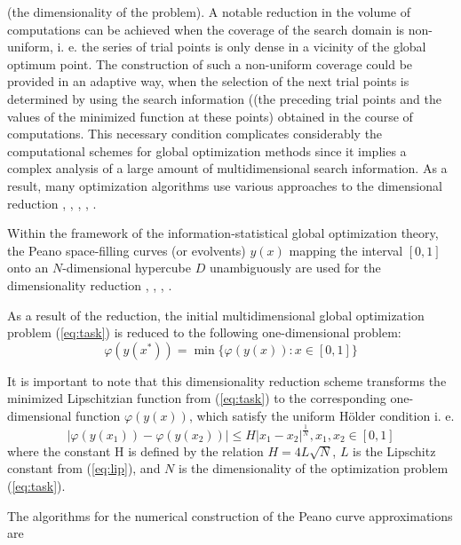 \documentclass{aims}
\theoremstyle{definition}
\begin{document}
(the dimensionality of the problem). A notable reduction in the volume of computations
can be achieved when the coverage of the search domain is non-uniform, i. e. the series
of trial points is only dense in a vicinity of the global optimum point. The construction
of such a non-uniform coverage could be provided in an adaptive way, when the selection
of the next trial points is determined by using the search information ((the preceding
trial points and the values of the minimized function at these points) obtained in the course
of computations. This necessary condition complicates considerably the computational schemes
for global optimization methods since it implies a complex analysis of a large amount
of multidimensional search information. As a result, many optimization algorithms use
various approaches to the dimensional reduction \cite{pinterGO}, \cite{sergeyevStronginLera2013}, \cite{strongin1978}, \cite{stronginGergelBarkalovParGO}, \cite{strSergGO}.
\par
Within the framework of the information-statistical global optimization theory,
the Peano space-filling curves (or evolvents) \(y(x)\) mapping the interval \([0,1]\)
onto an \(N\)-dimensional hypercube \(D\) unambiguously are used for the dimensionality
reduction \cite{sergeyevStronginLera2013}, \cite{strongin1978}, \cite{stronginGergelBarkalovParGO}, \cite{strSergGO}.
\par
As a result of the reduction, the initial multidimensional global optimization
problem (\ref{eq:task}) is reduced to the following one-dimensional problem:
\begin{equation}
\label{eq:oneDimTask}
\varphi(y(x^*))=\min\{\varphi(y(x)):x\in [0,1]\}
\end{equation}
\par
It is important to note that this dimensionality reduction scheme transforms the minimized
Lipschitzian function from (\ref{eq:task}) to the corresponding one-dimensional
function \(\varphi(y(x))\), which satisfy the uniform H{\"o}lder condition i. e.
\begin{equation}
\label{eq:holder}
|\varphi(y(x_1))-\varphi(y(x_2))|\leq H{|x_1-x_2|}^{\frac{1}{N}},x_1,x_2\in[0,1]
\end{equation}
where the constant H is defined by the relation \(H=4L\sqrt{N}\), \(L\) is the Lipschitz
constant from (\ref{eq:lip}), and \(N\) is the dimensionality of the optimization problem (\ref{eq:task}).
\par
The algorithms for the numerical construction of the Peano curve approximations are
\end{document}
